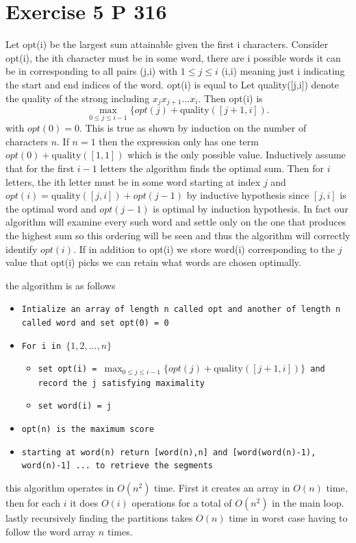\documentclass{amsart}
\begin{document}
\section{Exercise 5 P 316}
Let opt(i) be the largest sum attainable given the first i characters.
Consider opt(i), the ith character must be in some word, there are i possible words it can be in corresponding to all
pairs (j,i) with $1 \le j \le i$ (i,i) meaning just i indicating the start and end indices of the word. opt(i) is equal to
Let quality([j,i]) denote the quality of the strong including  $x_jx_{j+1}...x_i$. Then opt(i) is 
 \[
     \max_{0 \le j \le i-1}\{opt(j)+\text{quality}([j+1,i])
.\] 
with $opt(0) = 0$.
This is true as shown by induction on the number of characters  $n$. If $n=1$ then the expression only has one term $opt(0) + \text{quality}([1,1])$ 
which is the only possible value. Inductively assume that for the first $i-1$ letters the algorithm finds the optimal sum. Then for $i$ letters,
the  ith letter must be in some word starting at index $j$ and $opt(i) = \text{quality}([j,i]) + opt(j-1)$ by inductive hypothesis since  $[j,i]$ is the optimal word
and $opt(j-1)$ is optimal by induction hypothesis. In fact our algorithm will examine every such word and settle only on the one that produces the highest sum so this ordering will be seen
and thus the algorithm will correctly identify $opt(i)$. If in addition to opt(i) we store word(i) corresponding to the $j$ value that opt(i) picks we can retain what words
are chosen optimally.

the algorithm is as follows
{\small
    \begin{itemize}
        \item \texttt{Intialize an array of length n called opt and another of length n called word and set opt(0) = 0}
        \item \texttt{For i in $\{1,2,...,n\}$}
             \begin{itemize}
                 \item \texttt{set opt(i) = $\max_{0 \le j \le i-1}\{opt(j) + \text{quality}([j+1,i])\}$ and record the j satisfying maximality}
                 \item \texttt{set word(i) = j}
            \end{itemize}
        \item \texttt{opt(n) is the maximum score}
        \item \texttt{starting at word(n) return [word(n),n] and [word(word(n)-1), word(n)-1] ... to retrieve the segments}
    \end{itemize}
} 
this algorithm operates in $O(n^2)$
time. First it creates an array in $O(n)$ time, then for each $i$ it does $O(i)$ operations for a total of $O(n^2)$ in the 
main loop. lastly recursively finding the partitions takes $O(n)$ time in worst case having to follow the word array $n$ times.
\end{document}
